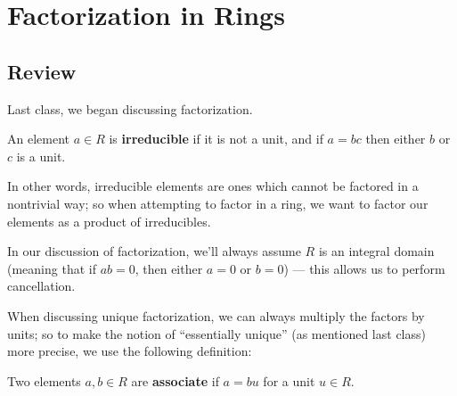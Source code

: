 



\section{Factorization in Rings}

\subsection{Review}

Last class, we began discussing factorization. 

\begin{definition}
 An element $a \in R$ is \textbf{irreducible} if it is not a unit, and if $a = bc$ then either $b$ or $c$ is a unit.
\end{definition}

In other words, irreducible elements are ones which cannot be factored in a nontrivial way; so when attempting to factor in a ring, we want to factor our elements as a product of irreducibles. 

In our discussion of factorization, we'll always assume $R$ is an integral domain (meaning that if $ab = 0$, then either $a = 0$ or $b = 0$) --- this allows us to perform cancellation. 

When discussing unique factorization, we can always multiply the factors by units; so to make the notion of ``essentially unique'' (as mentioned last class) more precise, we use the following definition:

\begin{definition}
 Two elements $a, b \in R$ are \textbf{associate} if $a = bu$ for a unit $u \in R$. 
\end{definition}

